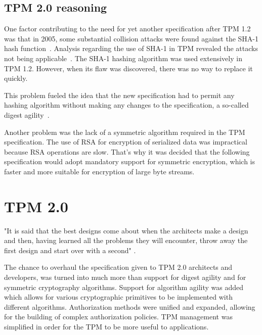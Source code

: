 
\subsection{TPM 2.0 reasoning}
One factor contributing to the need for yet another specification after TPM 1.2 was that in 2005, some substantial collision attacks were found against the SHA-1 hash function~\cite{wang2005findingShaBroken}. Analysis regarding the use of SHA-1 in TPM revealed the attacks not being applicable~\cite{tcg_tpm1.12_sha-1_uses}. The SHA-1 hashing algorithm was used extensively in TPM 1.2. However, when its flaw was discovered, there was no way to replace it quickly. 

This problem fueled the idea that the new specification had to permit any hashing algorithm without making any changes to the specification, a so-called digest agility~\cite[p.~4]{arthur2015practical}. 

Another problem was the lack of a symmetric algorithm required in the TPM specification. The use of RSA for encryption of serialized data was impractical because RSA operations are slow. That's why it was decided that the following specification would adopt mandatory support for symmetric encryption, which is faster and more suitable for encryption of large byte streams. 


\section{TPM 2.0}\label{sec:tpm2}
"It is said that the best designs come about when the architects make a design and
then, having learned all the problems they will encounter, throw away the first design and
start over with a second" \cite[p.~4]{arthur2015practical}.

The chance to overhaul the specification given to TPM 2.0 architects and developers, was turned into much more than support for digest agility and for symmetric cryptography algorithms. Support for algorithm agility was added which allows for various cryptographic primitives to be implemented with different algorithms. Authorization methods were unified and expanded, allowing for the building of complex authorization policies. TPM management was simplified in order for the TPM to be more useful to applications.

